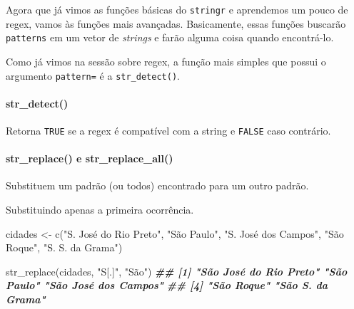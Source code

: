 \documentclass[
]{book}
\newenvironment{Shaded}{\begin{snugshade}}{\end{snugshade}}
\newcommand{\AttributeTok}[1]{\textcolor[rgb]{0.77,0.63,0.00}{#1}}
\newcommand{\DocumentationTok}[1]{\textcolor[rgb]{0.56,0.35,0.01}{\textbf{\textit{#1}}}}
\newcommand{\FunctionTok}[1]{\textcolor[rgb]{0.00,0.00,0.00}{#1}}
\newcommand{\NormalTok}[1]{#1}
\newcommand{\OtherTok}[1]{\textcolor[rgb]{0.56,0.35,0.01}{#1}}
\newcommand{\StringTok}[1]{\textcolor[rgb]{0.31,0.60,0.02}{#1}}
\begin{document}
Agora que já vimos as funções básicas do \texttt{stringr} e aprendemos um pouco de regex, vamos às funções mais avançadas. Basicamente, essas funções buscarão \texttt{patterns} em um vetor de \emph{strings} e farão alguma coisa quando encontrá-lo.

Como já vimos na sessão sobre regex, a função mais simples que possui o argumento \texttt{pattern=} é a \texttt{str\_detect()}.

\hypertarget{str_detect}{%
\paragraph*{str\_detect()}\label{str_detect}}

Retorna \texttt{TRUE} se a regex é compatível com a string e \texttt{FALSE} caso contrário.

\begin{Shaded}
\end{Shaded}

\hypertarget{str_replace-e-str_replace_all}{%
\paragraph*{str\_replace() e str\_replace\_all()}\label{str_replace-e-str_replace_all}}

Substituem um padrão (ou todos) encontrado para um outro padrão.

Substituindo apenas a primeira ocorrência.

\begin{Shaded}
\begin{Highlighting}[]
\NormalTok{cidades }\OtherTok{\textless{}{-}} \FunctionTok{c}\NormalTok{(}\StringTok{"S. José do Rio Preto"}\NormalTok{, }\StringTok{"São Paulo"}\NormalTok{, }\StringTok{"S. José dos Campos"}\NormalTok{, }\StringTok{"São Roque"}\NormalTok{, }\StringTok{"S. S. da Grama"}\NormalTok{)}

\FunctionTok{str\_replace}\NormalTok{(cidades, }\StringTok{"S[.]"}\NormalTok{, }\StringTok{"São"}\NormalTok{)}
\DocumentationTok{\#\# [1] "São José do Rio Preto" "São Paulo"             "São José dos Campos"  }
\DocumentationTok{\#\# [4] "São Roque"             "São S. da Grama"}
\end{Highlighting}
\end{Shaded}
\end{document}

